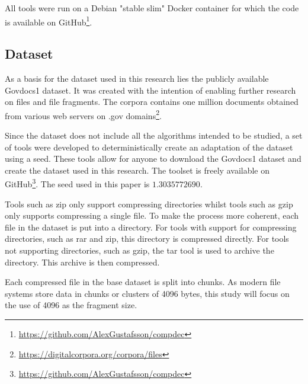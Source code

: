 \documentclass[conference]{IEEEtran}
\begin{document}
All tools were run on a Debian "stable slim" Docker container for which the code is available on GitHub\footnote{\href{https://github.com/AlexGustafsson/compdec}{https://github.com/AlexGustafsson/compdec}}.

\subsection{Dataset}
\label{method:dataset}

As a basis for the dataset used in this research lies the publicly available Govdocs1 dataset. It was created with the intention of enabling further research on files and file fragments. The corpora contains one million documents obtained from various web servers on .gov domains\footnote{\href{https://digitalcorpora.org/corpora/files}{https://digitalcorpora.org/corpora/files}}.

Since the dataset does not include all the algorithms intended to be studied, a set of tools were developed to deterministically create an adaptation of the dataset using a seed. These tools allow for anyone to download the Govdocs1 dataset and create the dataset used in this research. The toolset is freely available on GitHub\footnote{\href{https://github.com/AlexGustafsson/compdec}{https://github.com/AlexGustafsson/compdec}}. The seed used in this paper is $1.3035772690$.

Tools such as zip only support compressing directories whilst tools such as gzip only supports compressing a single file. To make the process more coherent, each file in the dataset is put into a directory. For tools with support for compressing directories, such as rar and zip, this directory is compressed directly. For tools not supporting directories, such as gzip, the tar tool is used to archive the directory. This archive is then compressed.

Each compressed file in the base dataset is split into chunks. As modern file systems store data in chunks or clusters of 4096 bytes\cite{PENROSE2013}, this study will focus on the use of 4096 as the fragment size.

\end{document}
